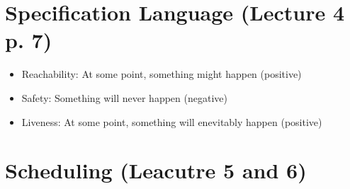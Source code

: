 \documentclass{article}
\begin{document}
	\section{Specification Language (Lecture 4 p. 7)}
		\begin{itemize}
			\item Reachability: At some point, something might happen (positive)
			\item Safety: Something will never happen (negative)
			\item Liveness: At some point, something will enevitably happen (positive)
		\end{itemize}
	
	\section{Scheduling (Leacutre 5 and 6)}
\end{document}
